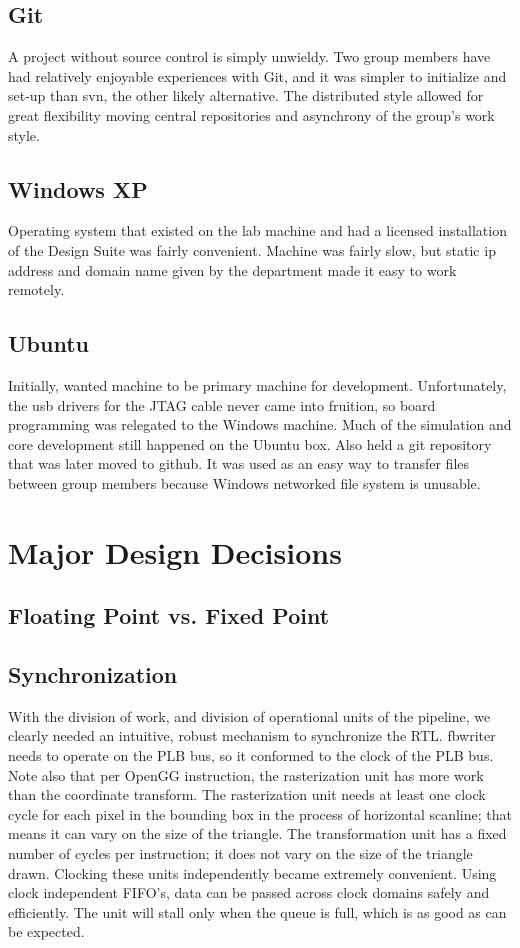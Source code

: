 \documentclass[letterpaper,10pt]{article}
\begin{document}
\subsection{Git}
A project without source control is simply unwieldy.  Two group members have had relatively enjoyable experiences with Git, and it was simpler to initialize and set-up than svn, the other likely alternative.  The distributed style allowed for great flexibility moving central repositories and asynchrony of the group's work style.

\subsection{Windows XP}
Operating system that existed on the lab machine and had a licensed installation of the Design Suite was fairly convenient.  Machine was fairly slow, but static ip address and domain name given by the department made it easy to work remotely.

\subsection{Ubuntu}
Initially, wanted machine to be primary machine for development.  Unfortunately, the usb drivers for the JTAG cable never came into fruition, so board programming was relegated to the Windows machine.  Much of the simulation and core development still happened on the Ubuntu box.  Also held a git repository that was later moved to github.  It was used as an easy way to transfer files between group members because Windows networked file system is unusable.  


\section{Major Design Decisions}
\subsection{Floating Point vs. Fixed Point}

\subsection{Synchronization}
With the division of work, and division of operational units of the pipeline, we clearly needed an intuitive, robust mechanism to synchronize the RTL.  fbwriter needs to operate on the PLB bus, so it conformed to the clock of the PLB bus.  Note also that per OpenGG instruction, the rasterization unit has more work than the coordinate transform.  The rasterization unit needs at least one clock cycle for each pixel in the bounding box in the process of horizontal scanline; that means it can vary on the size of the triangle.  The transformation unit has a fixed number of cycles per instruction; it does not vary on the size of the triangle drawn.  Clocking these units independently became extremely convenient.  Using clock independent FIFO's, data can be passed across clock domains safely and efficiently.  The unit will stall only when the queue is full, which is as good as can be expected.
\end{document}
